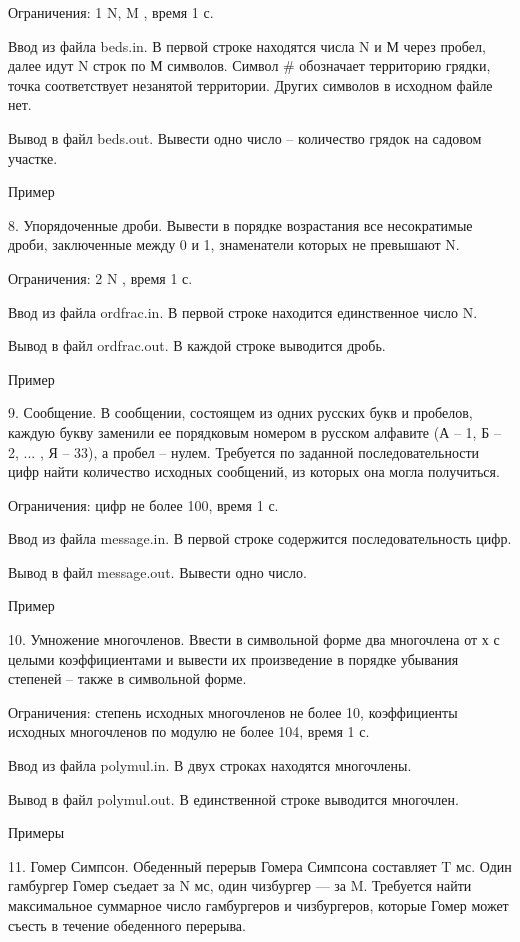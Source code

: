 \documentclass[]{article}
\begin{document}
\begin{enumerate}
Ограничения: 1 \leq N, M , время 1 с.

Ввод из файла beds.in. В первой строке находятся числа N и М через пробел, далее идут N строк по М символов. Символ # обозначает территорию грядки, точка соответствует незанятой территории. Других символов в исходном файле нет.

Вывод в файл beds.out. Вывести одно число – количество грядок на садовом участке.

Пример



8. Упорядоченные дроби. Вывести в порядке возрастания все несократимые дроби, заключенные между 0 и 1, знаменатели которых не превышают N.

Ограничения: 2 \leq N , время 1 с.

Ввод из файла ordfrac.in. В первой строке находится единственное число N.

Вывод в файл ordfrac.out. В каждой строке выводится дробь.

Пример



9. Сообщение. В сообщении, состоящем из одних русских букв и пробелов, каждую букву заменили ее порядковым номером в русском алфавите (А – 1, Б – 2, ... , Я – 33), а пробел – нулем. Требуется по заданной последовательности цифр найти количество исходных сообщений, из которых она могла получиться.

Ограничения: цифр не более 100, время 1 с.

Ввод из файла message.in. В первой строке содержится последовательность цифр.

Вывод в файл message.out. Вывести одно число.

Пример



10. Умножение многочленов. Ввести в символьной форме два многочлена от х с целыми коэффициентами и вывести их произведение в порядке убывания степеней – также в символьной форме.

Ограничения: степень исходных многочленов не более 10, коэффициенты исходных многочленов по модулю не более 104, время 1 с.

Ввод из файла polymul.in. В двух строках находятся многочлены.

Вывод в файл polymul.out. В единственной строке выводится многочлен.

Примеры



11. Гомер Симпсон. Обеденный перерыв Гомера Симпсона составляет T мс. Один гамбургер Гомер съедает за N мс, один чизбургер — за M. Требуется найти максимальное суммарное число гамбургеров и чизбургеров, которые Гомер может съесть в течение обеденного перерыва.


\end{enumerate}
\end{document}
